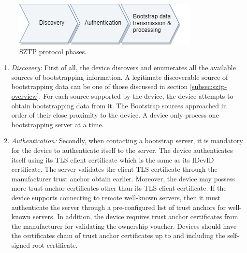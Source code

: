 \begin{figure}[htbp]
	\centering
	\includegraphics[width=0.5\linewidth]{Images/sztp-Protocol}
	\caption{SZTP protocol phases.}
	\label{fig:sztp-protocol}
\end{figure}
\begin{enumerate}
	\item \textit{Discovery:} First of all, the device discovers and enumerates all the available sources of bootstrapping information. A legitimate discoverable source of bootstrapping data can be one of those discussed in section \ref{subsec:sztp-overview}. For each source supported by the device, the device attempts to obtain bootstrapping data from it. The Bootstrap sources approached in order of their close proximity to the device. A device only process one bootstrapping server at a time.
	
	\item \textit{Authentication:} Secondly, when contacting a bootstrap server, it is mandatory for the device to authenticate itself to the server. The device authenticates itself using its TLS client certificate which is the same as its IDevID certificate. The server validates the client TLS certificate through the manufacturer trust anchor obtain earlier. Moreover, the device may possess more trust anchor certificates other than its TLS client certificate. If the device supports connecting to remote well-known servers, then it must authenticate the server through a pre-configured list of trust anchors for well-known servers. In addition, the device requires trust anchor certificates from the manufacturer for validating the ownership voucher. Devices should have the certificates chain of trust anchor certificates up to and including the self-signed root certificate. 
	

\end{enumerate}
